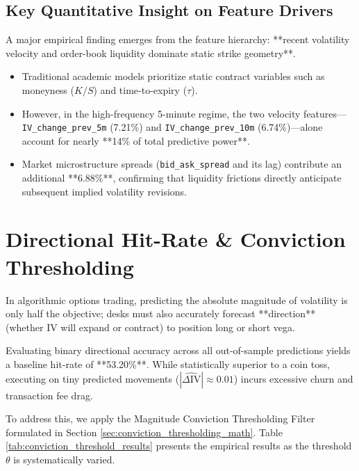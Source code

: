 \subsection{Key Quantitative Insight on Feature Drivers}
A major empirical finding emerges from the feature hierarchy: **recent volatility velocity and order-book liquidity dominate static strike geometry**. 
\begin{itemize}
    \item Traditional academic models prioritize static contract variables such as moneyness ($K/S$) and time-to-expiry ($\tau$).
    \item However, in the high-frequency 5-minute regime, the two velocity features—\texttt{IV\_change\_prev\_5m} (7.21\%) and \texttt{IV\_change\_prev\_10m} (6.74\%)—alone account for nearly **14\% of total predictive power**.
    \item Market microstructure spreads (\texttt{bid\_ask\_spread} and its lag) contribute an additional **6.88\%**, confirming that liquidity frictions directly anticipate subsequent implied volatility revisions.
\end{itemize}

\section{Directional Hit-Rate \& Conviction Thresholding}
\label{sec:conviction_thresholding_results}

In algorithmic options trading, predicting the absolute magnitude of volatility is only half the objective; desks must also accurately forecast **direction** (whether IV will expand or contract) to position long or short vega.

Evaluating binary directional accuracy across all out-of-sample predictions yields a baseline hit-rate of **53.20\%**. While statistically superior to a coin toss, executing on tiny predicted movements ($|\widehat{\Delta \text{IV}}| \approx 0.01$) incurs excessive churn and transaction fee drag.

To address this, we apply the Magnitude Conviction Thresholding Filter formulated in Section \ref{sec:conviction_thresholding_math}. Table \ref{tab:conviction_threshold_results} presents the empirical results as the threshold $\theta$ is systematically varied.

